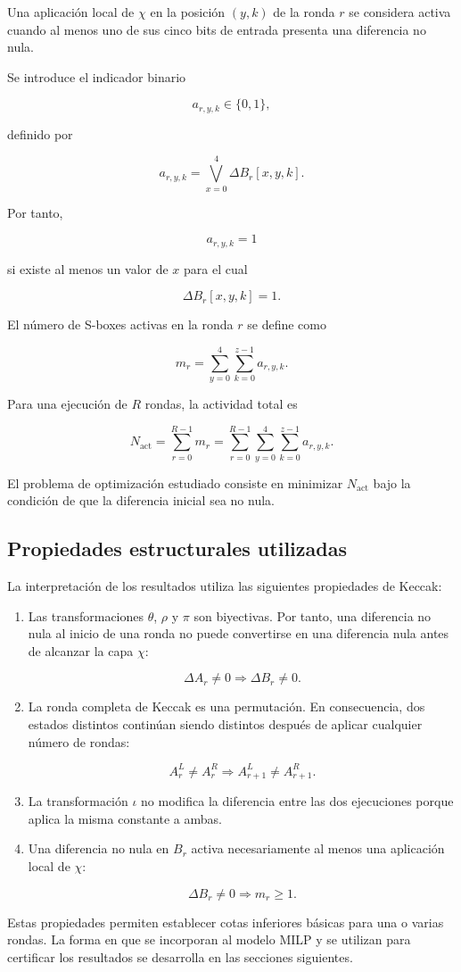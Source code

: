 Una aplicación local de $\chi$ en la posición $(y,k)$ de la ronda $r$ se
considera activa cuando al menos uno de sus cinco bits de entrada presenta
una diferencia no nula.

Se introduce el indicador binario

\[
a_{r,y,k} \in \{0,1\},
\]

definido por

\[
a_{r,y,k}
=
\bigvee_{x=0}^{4}
\Delta B_r[x,y,k].
\]

Por tanto,

\[
a_{r,y,k}=1
\]

si existe al menos un valor de $x$ para el cual

\[
\Delta B_r[x,y,k]=1.
\]

El número de S-boxes activas en la ronda $r$ se define como

\[
m_r
=
\sum_{y=0}^{4}
\sum_{k=0}^{z-1}
a_{r,y,k}.
\]

Para una ejecución de $R$ rondas, la actividad total es

\[
N_{\mathrm{act}}
=
\sum_{r=0}^{R-1}
m_r
=
\sum_{r=0}^{R-1}
\sum_{y=0}^{4}
\sum_{k=0}^{z-1}
a_{r,y,k}.
\]

El problema de optimización estudiado consiste en minimizar
$N_{\mathrm{act}}$ bajo la condición de que la diferencia inicial sea no
nula.


\subsection{Propiedades estructurales utilizadas}
\label{subsec:propiedades_estructurales}

La interpretación de los resultados utiliza las siguientes propiedades de
Keccak:

\begin{enumerate}
    \item Las transformaciones $\theta$, $\rho$ y $\pi$ son biyectivas.
    Por tanto, una diferencia no nula al inicio de una ronda no puede
    convertirse en una diferencia nula antes de alcanzar la capa $\chi$:

    \[
    \Delta A_r \neq 0
    \Longrightarrow
    \Delta B_r \neq 0.
    \]

    \item La ronda completa de Keccak es una permutación. En consecuencia,
    dos estados distintos continúan siendo distintos después de aplicar
    cualquier número de rondas:

    \[
    A_r^L \neq A_r^R
    \Longrightarrow
    A_{r+1}^L \neq A_{r+1}^R.
    \]

    \item La transformación $\iota$ no modifica la diferencia entre las
    dos ejecuciones porque aplica la misma constante a ambas.

    \item Una diferencia no nula en $B_r$ activa necesariamente al menos
    una aplicación local de $\chi$:

    \[
    \Delta B_r \neq 0
    \Longrightarrow
    m_r \geq 1.
    \]
\end{enumerate}

Estas propiedades permiten establecer cotas inferiores básicas para una o
varias rondas. La forma en que se incorporan al modelo MILP y se utilizan
para certificar los resultados se desarrolla en las secciones siguientes.